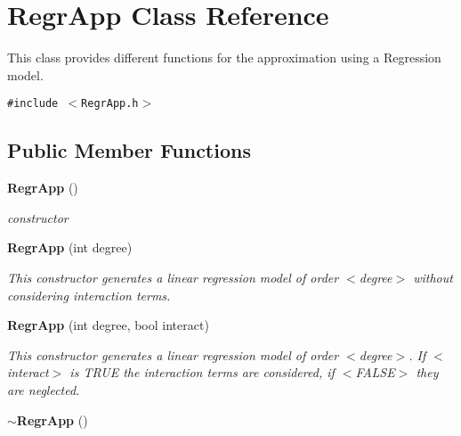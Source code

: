 \section{Regr\-App Class Reference}
\label{classRegrApp}
This class provides different functions for the approximation using a Regression model.  


{\tt \#include $<$Regr\-App.h$>$}

\subsection*{Public Member Functions}
\begin{CompactItemize}
\item 
{\bf Regr\-App} ()\label{classRegrApp_fa0ef6c6b2990d1db8267e7879fcea3d}

\begin{CompactList}\small\item\em constructor \item\end{CompactList}\item 
{\bf Regr\-App} (int degree)
\begin{CompactList}\small\item\em This constructor generates a linear regression model of order $<$degree$>$ without considering interaction terms. \item\end{CompactList}\item 
{\bf Regr\-App} (int degree, bool interact)
\begin{CompactList}\small\item\em This constructor generates a linear regression model of order $<$degree$>$. If $<$interact$>$ is TRUE the interaction terms are considered, if $<$FALSE$>$ they are neglected. \item\end{CompactList}\item 
{\bf $\sim$Regr\-App} ()\label{classRegrApp_4b527c8600487a91ce96d154f6b874e2}


\end{CompactItemize}
